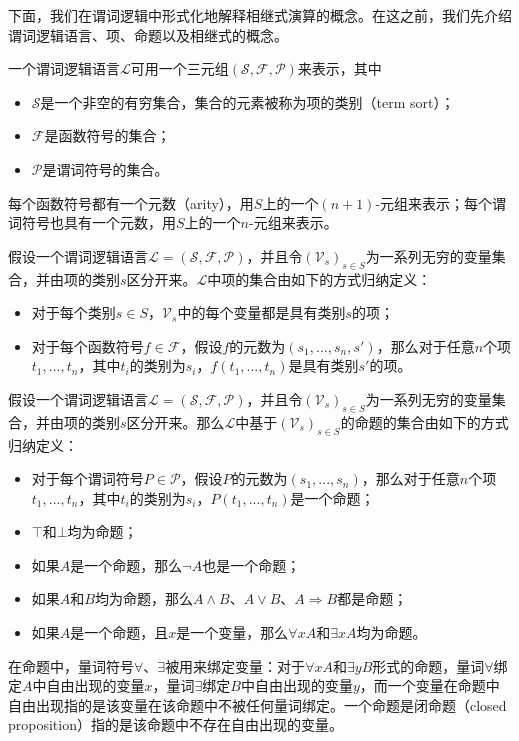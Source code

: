 下面，我们在谓词逻辑中形式化地解释相继式演算的概念。在这之前，我们先介绍谓词逻辑语言、项、命题以及相继式的概念。
\begin{definition}[谓词逻辑语言]
	一个谓词逻辑语言$\mathcal{L}$可用一个三元组$(\mathcal{S}, \mathcal{F}, \mathcal{P})$来表示，其中
	\begin{itemize}
		\item $\mathcal{S}$是一个非空的有穷集合，集合的元素被称为项的类别（term sort）；
		\item $\mathcal{F}$是函数符号的集合；
		\item $\mathcal{P}$是谓词符号的集合。
	\end{itemize}
	每个函数符号都有一个元数（arity），用$S$上的一个$(n+1)$-元组来表示；每个谓词符号也具有一个元数，用$S$上的一个$n$-元组来表示。
	
\end{definition}

\begin{definition}[项]
	假设一个谓词逻辑语言$\mathcal{L}=(\mathcal{S}, \mathcal{F}, \mathcal{P})$，并且令$(\mathcal{V}_s)_{s\in S}$为一系列无穷的变量集合，并由项的类别$s$区分开来。$\mathcal{L}$中项的集合由如下的方式归纳定义：
		\begin{itemize}
		\item 对于每个类别$s\in S$，$\mathcal{V}_s$中的每个变量都是具有类别$s$的项；
		\item 对于每个函数符号$f\in\mathcal{F}$，假设$f$的元数为$(s_1,...,s_n, s')$，那么对于任意$n$个项$t_1,...,t_n$，其中$t_i$的类别为$s_i$，$f(t_1,...,t_n)$是具有类别$s'$的项。
	\end{itemize}
\end{definition}

\begin{definition}[命题]
		假设一个谓词逻辑语言$\mathcal{L}=(\mathcal{S}, \mathcal{F}, \mathcal{P})$，并且令$(\mathcal{V}_s)_{s\in S}$为一系列无穷的变量集合，并由项的类别$s$区分开来。那么$\mathcal{L}$中基于$(\mathcal{V}_s)_{s\in S}$的命题的集合由如下的方式归纳定义：
		\begin{itemize}
			\item 对于每个谓词符号$P\in\mathcal{P}$，假设$P$的元数为$(s_1,...,s_n)$，那么对于任意$n$个项$t_1,...,t_n$，其中$t_i$的类别为$s_i$，$P(t_1,...,t_n)$是一个命题；
			\item $\top$和$\bot$均为命题；
			\item 如果$A$是一个命题，那么$\neg A$也是一个命题；
			\item 如果$A$和$B$均为命题，那么$A\wedge B$、$A\vee B$、$A\Rightarrow B$都是命题；
			\item 如果$A$是一个命题，且$x$是一个变量，那么$\forall x A$和$\exists x A$均为命题。
		\end{itemize}
	
\end{definition}
在命题中，量词符号$\forall$、$\exists$被用来绑定变量：对于$\forall x A$和$\exists y B$形式的命题，量词$\forall$绑定$A$中自由出现的变量$x$，量词$\exists$绑定$B$中自由出现的变量$y$，而一个变量在命题中自由出现指的是该变量在该命题中不被任何量词绑定。一个命题是闭命题（closed proposition）指的是该命题中不存在自由出现的变量。

